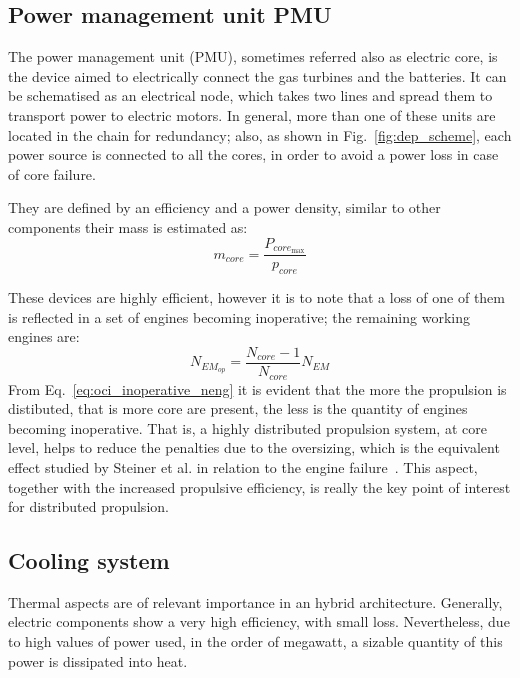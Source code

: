 \subsection{Power management unit PMU}
\label{subsec:chap3_core_model}

The power management unit (PMU), sometimes referred also as electric core, is the device aimed to electrically connect the gas turbines and the batteries. 
It can be schematised as an electrical node, which takes two lines and spread them to transport power to electric motors. 
In general, more than one of these units are located in the chain for redundancy; also, as shown in Fig.~\ref{fig:dep_scheme}, each power source is connected to all the cores, in order to avoid a power loss in case of core failure. 

They are defined by an efficiency and a power density, similar to other components their mass is estimated as:
\begin{equation}
\label{eq:core_mass}
m_{core} = \frac{P_{{core}_{\max}}}{p_{core}}
\end{equation}

These devices are highly efficient, however it is to note that a loss of one of them is reflected in a set of engines becoming inoperative; the remaining working engines are:
\begin{equation}
	\label{eq:oci_inoperative_neng}
	N_{EM_{op}} = \frac{N_{core}-1}{N_{core}}N_{EM}
\end{equation} 
From Eq.~\eqref{eq:oci_inoperative_neng} it is evident that the more the propulsion is distibuted, that is more core are present, the less is the quantity of engines becoming inoperative. 
That is, a highly distributed propulsion system, at core level, helps to reduce the penalties due to the oversizing, which is the equivalent effect studied by Steiner et al. in relation to the engine failure~\cite{bib:steiner}. 
This aspect, together with the increased propulsive efficiency, is really the key point of interest for distributed propulsion. 

\subsection{Cooling system}
\label{subsec:chap3_cooling_system}

Thermal aspects are of relevant importance in an hybrid architecture.
Generally, electric components show a very high efficiency, with small loss. 
Nevertheless, due to high values of power used, in the order of megawatt, a sizable quantity of this power is dissipated into heat. 

